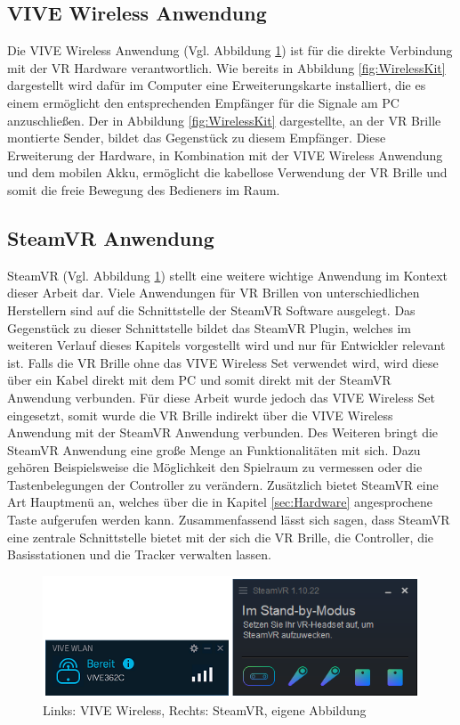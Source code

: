 \subsection{VIVE Wireless Anwendung}\label{sec:VIVEWireless}
Die VIVE Wireless Anwendung (Vgl. Abbildung \ref{fig:VIVEWirelessSteamVR}) ist für die direkte Verbindung mit der VR Hardware verantwortlich. Wie bereits in Abbildung \ref{fig:WirelessKit} dargestellt wird dafür im Computer eine Erweiterungskarte installiert, die es einem ermöglicht den entsprechenden Empfänger für die Signale am PC anzuschließen. Der in Abbildung \ref{fig:WirelessKit} dargestellte, an der VR Brille montierte Sender, bildet das Gegenstück zu diesem Empfänger. Diese Erweiterung der Hardware, in Kombination mit der VIVE Wireless Anwendung und dem mobilen Akku, ermöglicht die kabellose Verwendung der VR Brille und somit die freie Bewegung des Bedieners im Raum.

\subsection{SteamVR Anwendung}\label{sec:SteamVR}
SteamVR (Vgl. Abbildung \ref{fig:VIVEWirelessSteamVR}) stellt eine weitere wichtige Anwendung im Kontext dieser Arbeit dar. Viele Anwendungen für VR Brillen von unterschiedlichen Herstellern sind auf die Schnittstelle der SteamVR Software ausgelegt. Das Gegenstück zu dieser Schnittstelle bildet das SteamVR Plugin, welches im weiteren Verlauf dieses Kapitels vorgestellt wird und nur für Entwickler relevant ist. Falls die VR Brille ohne das VIVE Wireless Set verwendet wird, wird diese über ein Kabel direkt mit dem PC und somit direkt mit der SteamVR Anwendung verbunden. Für diese Arbeit wurde jedoch das VIVE Wireless Set eingesetzt, somit wurde die VR Brille indirekt über die VIVE Wireless Anwendung mit der SteamVR Anwendung verbunden. Des Weiteren bringt die SteamVR Anwendung eine große Menge an Funktionalitäten mit sich. Dazu gehören Beispielsweise die Möglichkeit den Spielraum zu vermessen oder die Tastenbelegungen der Controller zu verändern. Zusätzlich bietet SteamVR eine Art Hauptmenü an, welches über die in Kapitel \ref{sec:Hardware} angesprochene Taste aufgerufen werden kann. Zusammenfassend lässt sich sagen, dass SteamVR eine zentrale Schnittstelle bietet mit der sich die VR Brille, die Controller, die Basisstationen und die Tracker verwalten lassen.
\begin{figure}[h]
	\centering
	\includegraphics[width=0.8\linewidth]{Bilder/A33_VIVESteam}
	\caption{Links: VIVE Wireless, Rechts: SteamVR, eigene Abbildung}
	\label{fig:VIVEWirelessSteamVR}
\end{figure}

